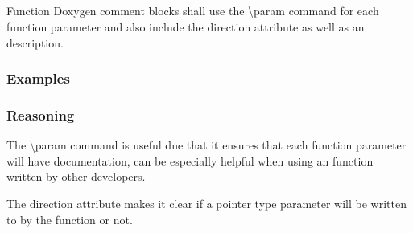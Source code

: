 \subsection*{\doxygenRule{}}

Function Doxygen comment blocks shall use the \textbackslash param command for each function parameter and also include the direction attribute as well as an description.

\subsubsection*{Examples}

\noindent
\begin{minipage}[t]{0.48\textwidth}
    

\end{minipage}\hfill
\begin{minipage}[t]{0.48\textwidth}
    
\end{minipage}

\subsubsection*{Reasoning}

The \textbackslash param command is useful due that it ensures that each function parameter will have documentation, can be especially helpful when using an function written by other developers.

The direction attribute makes it clear if a pointer type parameter will be written to by the function or not.
